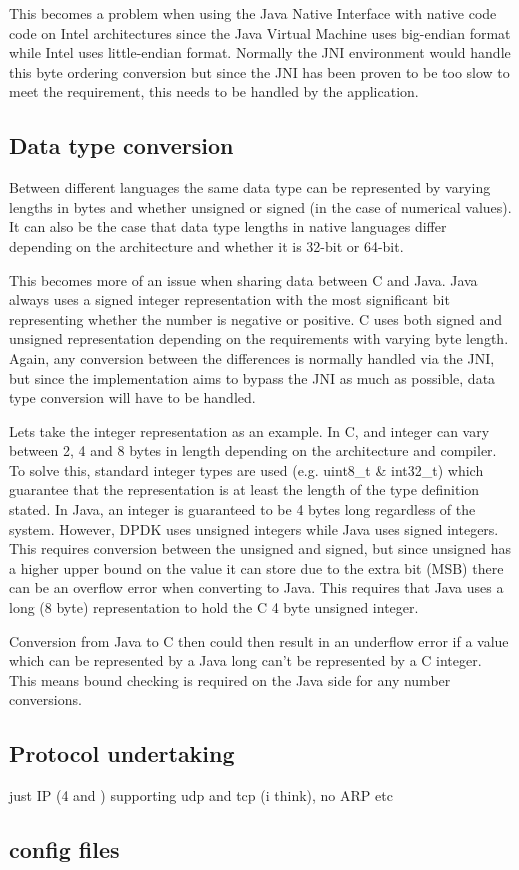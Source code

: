 \documentclass[final_report.tex]{subfiles}
\begin{document}
This becomes a problem when using the Java Native Interface with native code code on Intel architectures since the Java Virtual Machine uses big-endian format while Intel uses little-endian format. Normally the JNI environment would handle this byte ordering conversion but since the JNI has been proven to be too slow  to meet the requirement, this needs to be handled by the application.

\subsection{Data type conversion}
Between different languages the same data type can be represented by varying lengths in bytes and whether unsigned or signed (in the case of numerical values). It can also be the case that data type lengths in native languages differ depending on the architecture and whether it is 32-bit or 64-bit.

This becomes more of an issue when sharing data between C and Java. Java always uses a signed integer representation with the most significant bit representing whether the number is negative or positive. C uses both signed and unsigned representation depending on the requirements with varying byte length. Again, any conversion between the differences is normally handled via the JNI, but since the implementation aims to bypass the JNI as much as possible, data type conversion will have to be handled.

Lets take the integer representation as an example. In C, and integer can vary between 2, 4 and 8 bytes in length depending on the architecture and compiler. To solve this, standard integer types are used (e.g. uint8\_t \& int32\_t) which guarantee that the representation is at least the length of the type definition stated. In Java, an integer is guaranteed to be 4 bytes long regardless of the system. However, DPDK uses unsigned integers while Java uses signed integers. This requires conversion between the unsigned and signed, but since unsigned has a higher upper bound on the value it can store due to the extra bit (MSB) there can be an overflow error when converting to Java. This requires that Java uses a long (8 byte) representation to hold the C 4 byte unsigned integer.

Conversion from Java to C then could then result in an underflow error if a value which can be represented by a Java long can't be represented by a C integer. This means bound checking is required on the Java side for any number conversions.


\subsection{Protocol undertaking}

just IP (4 and ) supporting udp and tcp (i think), no ARP etc

\subsection{config files}
\end{document}
